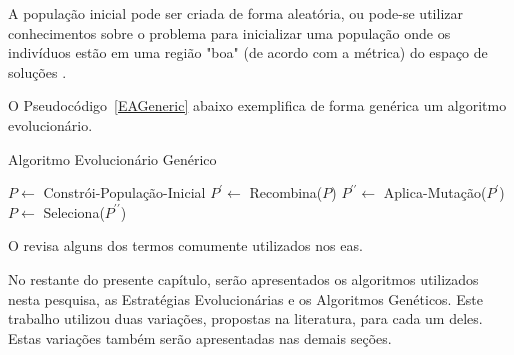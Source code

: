 A população inicial pode ser criada de forma aleatória, ou pode-se utilizar 
conhecimentos sobre o problema para inicializar uma população onde os indivíduos 
estão em uma região "boa" (de acordo com a métrica) do espaço de soluções 
\citep{Luke2013Metaheuristics}.

O Pseudocódigo~\ref{EAGeneric} abaixo exemplifica de forma genérica um algoritmo 
evolucionário.

\begin{algorithm}                      %
	\caption{Algoritmo Evolucionário Genérico}          %
	\label{EAGeneric}                           %
	\begin{algorithmic}                    %
		\State $P \gets $ Constrói-População-Inicial
		\Repeat
			\State $P^{\prime} \gets $ Recombina($P$)
			\State $P^{\prime \prime} \gets $ Aplica-Mutação($P^{\prime}$)
			\State $P \gets $ Seleciona($P^{\prime \prime}$)
		\EndProcedure
	\end{algorithmic}
\end{algorithm}

O  revisa alguns dos termos comumente utilizados nos 
\acp{ea}.

No restante do presente capítulo, serão apresentados os algoritmos utilizados 
nesta pesquisa, as Estratégias Evolucionárias e os Algoritmos Genéticos. Este 
trabalho utilizou duas variações, propostas na literatura, para cada um deles. 
Estas variações também serão apresentadas nas demais seções.

